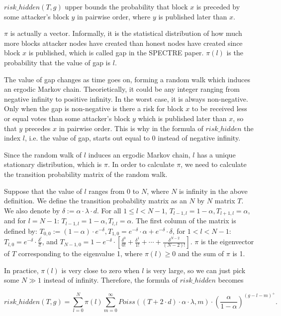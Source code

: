 \documentclass[a4paper,11pt]{article}
\begin{document}
$risk\_hidden(T,g)$ upper bounds the probability that block $x$ is preceded by
some attacker’s block $y$ in pairwise order, where $y$ is published later than
$x$.

$\pi$ is actually a vector. Informally, it is the statistical distribution of
how much more blocks attacker nodes have created than honest nodes have created
since block $x$ is published, which is called gap in the SPECTRE paper. $\pi(l)$
is the probability that the value of gap is $l$.

The value of gap changes as time goes on, forming a random walk which induces an
ergodic Markov chain. Theorietically, it could be any integer ranging from
negative infinity to positive infinity. In the worst case, it is always
non-negative. Only when the gap is non-negative is there a risk for block $x$ to
be received less or equal votes than some attacker’s block $y$ which is
published later than $x$, so that $y$ precedes $x$ in pairwise order. This is
why in the formula of $risk\_hidden$ the index $l$, i.e. the value of gap,
starts out equal to 0 instead of negative infinity.

Since the random walk of $l$ induces an ergodic Markov chain, $l$ has a unique
stationary distribution, which is $\pi$. In order to calculate $\pi$, we need to
calculate the transition probability matrix of the random walk.

Suppose that the value of $l$ ranges from 0 to $N$, where $N$ is infinity in the
above definition. We define the transition probability matrix as an $N$ by $N$
matrix $T$. We also denote by $\delta := \alpha \cdot \lambda \cdot d$. For all
$1 \leq l < N - 1$, $T_{l-1,l} = 1 - \alpha, T_{l+1,l} = \alpha$, and for $l = N
- 1$: $T_{l-1,l} = 1 - \alpha, T_{l,l} = \alpha$. The first column of the matrix
is defined by: $T_{0,0} := (1 - \alpha) \cdot e^{-\delta}, T_{1,0} = e^{-\delta}
\cdot \alpha + e^{-\delta} \cdot \delta$, for $1 < l < N - 1$: $T_{l,0} =
e^{-\delta} \cdot \frac{\delta^l}{l!}$, and $T_{N-1,0} = 1 - e^{-\delta} \cdot
\left[\frac{\delta^0}{0!} + \frac{\delta^1}{1!} + \cdots +
\frac{\delta^{N-2}}{(N-2)!}\right]$.  $\pi$ is the eigenvector of $T$
corresponding to the eigenvalue 1, where $\pi(l) \geq 0$ and the sum of $\pi$ is
1.

In practice, $\pi(l)$ is very close to zero when $l$ is very large, so we can
just pick some $N \gg 1$ instead of infinity. Therefore, the formula of
$risk\_hidden$ becomes

$$
risk\_hidden(T,g) = \sum_{l=0}^{N} \pi(l) \sum_{m=0}^{\infty} Poiss((T + 2 \cdot
d) \cdot \alpha \cdot \lambda, m) \cdot \left(\frac{\alpha}{1-\alpha}\right)^{(g
- l - m)^+}.
$$
\end{document}
